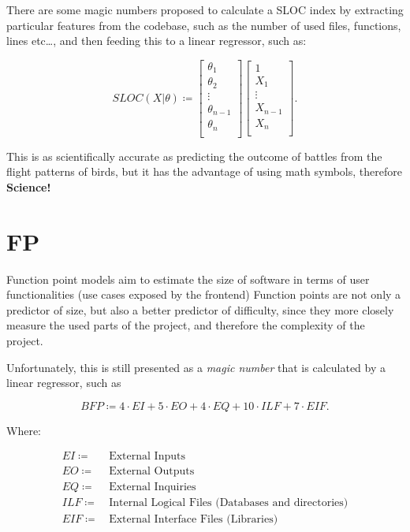 \documentclass[openright, twoside, twocolumn, a4paper, 10pt]{report}
\begin{document}
There are some magic numbers proposed to calculate a SLOC index by extracting particular features from the codebase, such as the number of
used files, functions, lines etc\dots, and then feeding this to a linear regressor, such as:

\[
	SLOC(X|\theta) \coloneqq \begin{bmatrix}
		\theta_1     \\
		\theta_2     \\
		\vdots       \\
		\theta_{n-1} \\
		\theta_n     \\
	\end{bmatrix} \begin{bmatrix}
		1       \\
		X_1     \\
		\vdots  \\
		X_{n-1} \\
		X_n     \\
	\end{bmatrix}
	.\]

This is as scientifically accurate as predicting the outcome of battles from the flight patterns of birds, but it has
the advantage of using math symbols, therefore \textbf{Science!}

\section{FP}
Function point models aim to estimate the size of software in terms of user functionalities (use cases exposed by the frontend)
Function points are not only a predictor of size, but also a better predictor of difficulty, since they more closely
measure the used parts of the project, and therefore the complexity of the project.

Unfortunately, this is still presented as a \emph{magic number} that is calculated by a linear regressor, such as

\[
	BFP \coloneqq  4 \cdot EI + 5 \cdot EO + 4 \cdot EQ + 10 \cdot ILF + 7 \cdot EIF
	.\]

Where:

\begin{align*}
	EI \coloneqq \,  & \text{External Inputs}                                    \\
	EO \coloneqq \,  & \text{External Outputs}                                   \\
	EQ \coloneqq \,  & \text{External Inquiries}                                 \\
	ILF \coloneqq \, & \text{Internal Logical Files (Databases and directories)} \\
	EIF \coloneqq \, & \text{External Interface Files (Libraries)}
\end{align*}
\end{document}

